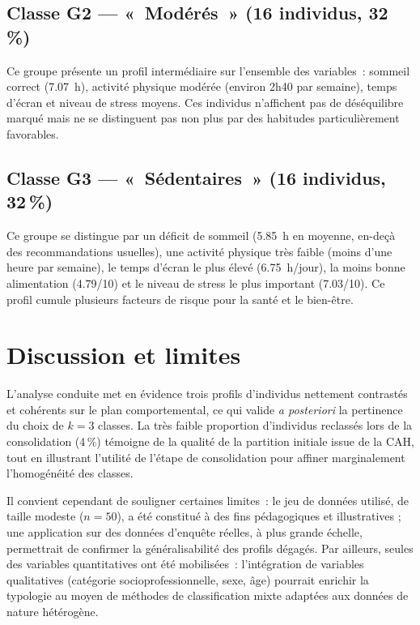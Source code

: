 \documentclass[11pt,a4paper,oneside]{book}
\begin{document}
\subsection*{Classe G2 --- «~Modérés~» (16 individus, 32\,\%)}
Ce groupe présente un profil intermédiaire sur l'ensemble des variables~: sommeil correct (7.07~h), activité physique modérée (environ 2h40 par semaine), temps d'écran et niveau de stress moyens. Ces individus n'affichent pas de déséquilibre marqué mais ne se distinguent pas non plus par des habitudes particulièrement favorables.

\subsection*{Classe G3 --- «~Sédentaires~» (16 individus, 32\,\%)}
Ce groupe se distingue par un déficit de sommeil (5.85~h en moyenne, en-deçà des recommandations usuelles), une activité physique très faible (moins d'une heure par semaine), le temps d'écran le plus élevé (6.75~h/jour), la moins bonne alimentation (4.79/10) et le niveau de stress le plus important (7.03/10). Ce profil cumule plusieurs facteurs de risque pour la santé et le bien-être.

\section{Discussion et limites}
L'analyse conduite met en évidence trois profils d'individus nettement contrastés et cohérents sur le plan comportemental, ce qui valide \emph{a posteriori} la pertinence du choix de $k = 3$ classes. La très faible proportion d'individus reclassés lors de la consolidation (4\,\%) témoigne de la qualité de la partition initiale issue de la CAH, tout en illustrant l'utilité de l'étape de consolidation pour affiner marginalement l'homogénéité des classes.

Il convient cependant de souligner certaines limites~: le jeu de données utilisé, de taille modeste ($n=50$), a été constitué à des fins pédagogiques et illustratives ; une application sur des données d'enquête réelles, à plus grande échelle, permettrait de confirmer la généralisabilité des profils dégagés. Par ailleurs, seules des variables quantitatives ont été mobilisées~: l'intégration de variables qualitatives (catégorie socioprofessionnelle, sexe, âge) pourrait enrichir la typologie au moyen de méthodes de classification mixte adaptées aux données de nature hétérogène.

\end{document}

